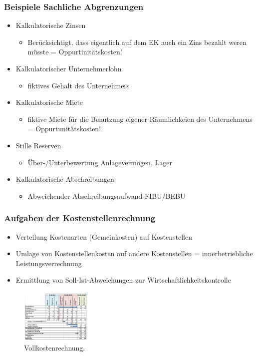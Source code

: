\documentclass[../ZF_Wing.tex]{subfiles}
\begin{document}
\subsubsection{Beispiele Sachliche Abgrenzungen}
\begin{itemize}
	\item Kalkulatorische Zinsen
	\begin{itemize}
		\item Berücksichtigt, dass eigentlich auf dem EK auch ein Zins bezahlt weren müsste = Oppurtinitätskosten!
	\end{itemize}		
		\item Kalkulatorischer Unternehmerlohn 
		\begin{itemize}
			\item fiktives Gehalt des Unternehmers			
		\end{itemize}
		\item Kalkulatorische Miete
		\begin{itemize}
			\item fiktive Miete für die Benutzung eigener Räumlichkeien des Unternehmens = Oppurtunitätskosten!
		\end{itemize}
		\item Stille Reserven
		\begin{itemize}
			\item Über-/Unterbewertung Anlagevermögen, Lager
		\end{itemize}
		\item Kalkulatorische Abschreibungen
		\begin{itemize}
			\item Abweichender Abschreibungsaufwand FIBU/BEBU
		\end{itemize}
\end{itemize}


\subsubsection{Aufgaben der Kostenstellenrechnung}
\begin{itemize}
	\item Verteilung Kostenarten (Gemeinkosten) auf Kostenstellen
	\item Umlage von Kostenstellenkosten auf andere Kostenstellen = innerbetriebliche Leistungsverrechnung
	\item Ermittlung von Soll-Ist-Abweichungen zur Wirtschaftlichkeitskontrolle
\end{itemize}

\begin{figure}[H]
\centering
\includegraphics[width=0.3\textwidth]{Resources/Image/Vollkostenrechnung.png}
\caption{\label{fig:Vollkostenrechnung}Vollkostenrechnung.}
\end{figure}
\end{document}
